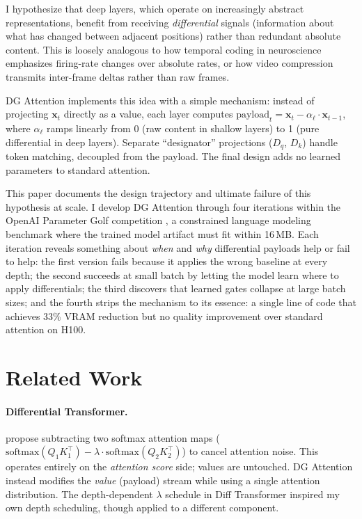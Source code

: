 \documentclass[11pt]{article}
\begin{document}
I hypothesize that deep layers, which operate on increasingly abstract representations, benefit from receiving \emph{differential} signals (information about what has changed between adjacent positions) rather than redundant absolute content. This is loosely analogous to how temporal coding in neuroscience emphasizes firing-rate changes over absolute rates, or how video compression transmits inter-frame deltas rather than raw frames.

DG Attention implements this idea with a simple mechanism: instead of projecting $\mathbf{x}_t$ directly as a value, each layer computes $\text{payload}_t = \mathbf{x}_t - \alpha_\ell \cdot \mathbf{x}_{t-1}$, where $\alpha_\ell$ ramps linearly from 0 (raw content in shallow layers) to 1 (pure differential in deep layers). Separate ``designator'' projections ($D_q$, $D_k$) handle token matching, decoupled from the payload. The final design adds no learned parameters to standard attention.

This paper documents the design trajectory and ultimate failure of this hypothesis at scale. I develop DG Attention through four iterations within the OpenAI Parameter Golf competition \citep{parametergolf2025}, a constrained language modeling benchmark where the trained model artifact must fit within 16\,MB. Each iteration reveals something about \emph{when} and \emph{why} differential payloads help or fail to help: the first version fails because it applies the wrong baseline at every depth; the second succeeds at small batch by letting the model learn where to apply differentials; the third discovers that learned gates collapse at large batch sizes; and the fourth strips the mechanism to its essence: a single line of code that achieves 33\% VRAM reduction but no quality improvement over standard attention on H100.

\section{Related Work}
\label{sec:related}

\paragraph{Differential Transformer.}
\citet{ye2024differential} propose subtracting two softmax attention maps ($\text{softmax}(Q_1 K_1^\top) - \lambda \cdot \text{softmax}(Q_2 K_2^\top)$) to cancel attention noise. This operates entirely on the \emph{attention score} side; values are untouched. DG Attention instead modifies the \emph{value} (payload) stream while using a single attention distribution. The depth-dependent $\lambda$ schedule in Diff Transformer inspired my own depth scheduling, though applied to a different component.
\end{document}
